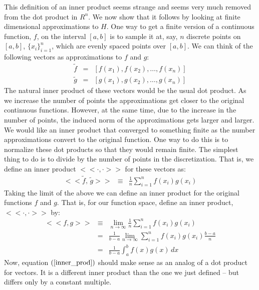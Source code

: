 \documentclass{article}
\begin{document}
This definition of an inner product seems strange and seems very much removed from the
dot product in $R^n$. We now show that it follows by looking at finite dimensional
approximations to $H$. One way to get a finite version of a continuous function, $f$,
on the interval $[a,b]$ is to sample
it at, say, $n$ discrete points on $[a,b]$, $\{x_i\}_{i=1}^n$, which
are evenly spaced points over $[a,b]$.
We can think of the following vectors as approximations to $f$ and $g$:
\begin{eqnarray*}
{\widetilde f} & = & [f(x_1), f(x_2), \ldots, f(x_n)] \\
{\widetilde g} & = & [g(x_1), g(x_2), \ldots, g(x_n)]
\end{eqnarray*}
The natural inner product of these vectors would be the usual dot product.
As we increase the number of points the approximations get closer to the original
continuous functions. However, at the same time, due to the increase in the
number of points, the induced norm of the approximations gets larger and larger.
We would like an inner product that converged to something finite as the number
approximations convert to the original function.
One way to do this is to normalize these dot products so that they would remain
finite. The simplest thing to do is to divide by the number of points
in the discretization.
That is, we define
an inner product $<\!\!<{\boldsymbol \cdot} ,{\boldsymbol \cdot}>\!\!>$
for these vectors as:
\begin{eqnarray}
  <\!\!<{\widetilde f}, \, {\widetilde g}>\!\!> & \equiv & \frac{1}{n} \sum_{i=1}^n f(x_i) g(x_i)
\end{eqnarray}
Taking the limit of the above we can define an inner product for the original functions
$f$ and $g$. That is, for our function space, define an inner product, $<\!\!<{\boldsymbol \cdot} ,{\boldsymbol \cdot}>\!\!>$ by:
\begin{eqnarray*}
  <\!\!<f, g>\!\!> & \equiv & \lim_{n\rightarrow \infty} \frac{1}{n} \sum_{i=1}^n f(x_i) g(x_i) \\
& = & \frac{1}{b-a} \lim_{n\rightarrow \infty}  \sum_{i=1}^n f(x_i) g(x_i) \frac{b-a}{n} \\
& = & \frac{1}{b-a} \int_{a}^b f(x) g(x) \, dx
\end{eqnarray*}
Now, equation $(\ref{inner_prod})$ should make sense as an analog of a
dot product for vectors. It is a different inner product than the one we just defined
 -- but differs only by a constant multiple.
\end{document}
